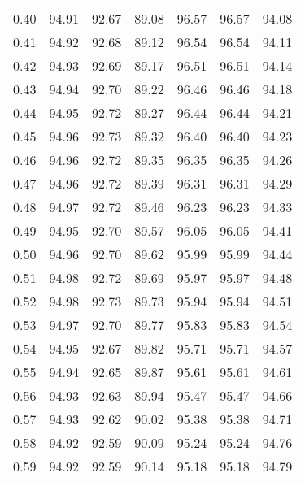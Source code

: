 \begin{tabular}{|c|c|c|c|c|c|c|}
      0.40 &     94.91 &     92.67 &      89.08 &   96.57 &      96.57 &         94.08 \\
      0.41 &     94.92 &     92.68 &      89.12 &   96.54 &      96.54 &         94.11 \\
      0.42 &     94.93 &     92.69 &      89.17 &   96.51 &      96.51 &         94.14 \\
      0.43 &     94.94 &     92.70 &      89.22 &   96.46 &      96.46 &         94.18 \\
      0.44 &     94.95 &     92.72 &      89.27 &   96.44 &      96.44 &         94.21 \\
      0.45 &     94.96 &     92.73 &      89.32 &   96.40 &      96.40 &         94.23 \\
      0.46 &     94.96 &     92.72 &      89.35 &   96.35 &      96.35 &         94.26 \\
      0.47 &     94.96 &     92.72 &      89.39 &   96.31 &      96.31 &         94.29 \\
      0.48 &     94.97 &     92.72 &      89.46 &   96.23 &      96.23 &         94.33 \\
      0.49 &     94.95 &     92.70 &      89.57 &   96.05 &      96.05 &         94.41 \\
      0.50 &     94.96 &     92.70 &      89.62 &   95.99 &      95.99 &         94.44 \\
      0.51 &     94.98 &     92.72 &      89.69 &   95.97 &      95.97 &         94.48 \\
      0.52 &     94.98 &     92.73 &      89.73 &   95.94 &      95.94 &         94.51 \\
      0.53 &     94.97 &     92.70 &      89.77 &   95.83 &      95.83 &         94.54 \\
      0.54 &     94.95 &     92.67 &      89.82 &   95.71 &      95.71 &         94.57 \\
      0.55 &     94.94 &     92.65 &      89.87 &   95.61 &      95.61 &         94.61 \\
      0.56 &     94.93 &     92.63 &      89.94 &   95.47 &      95.47 &         94.66 \\
      0.57 &     94.93 &     92.62 &      90.02 &   95.38 &      95.38 &         94.71 \\
      0.58 &     94.92 &     92.59 &      90.09 &   95.24 &      95.24 &         94.76 \\
      0.59 &     94.92 &     92.59 &      90.14 &   95.18 &      95.18 &         94.79 \\

\end{tabular}

